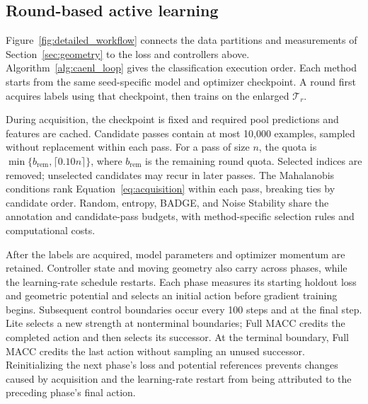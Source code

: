\documentclass[10pt,a4paper,twocolumn]{article}
\begin{document}
\subsection{Round-based active learning}
\label{sec:workflow}

Figure~\ref{fig:detailed_workflow} connects the data partitions and
measurements of Section~\ref{sec:geometry} to the loss and controllers
above. Algorithm~\ref{alg:caenl_loop} gives the classification execution
order. Each method starts from the same seed-specific model and optimizer
checkpoint. A round first acquires labels using that checkpoint, then
trains on the enlarged $\mathcal T_r$.

During acquisition, the checkpoint is fixed and required pool predictions
and features are cached. Candidate passes contain at most 10,000 examples,
sampled without replacement within each pass. For a pass of size $n$,
the quota is $\min\{b_{\mathrm{rem}},\lceil0.10n\rceil\}$, where
$b_{\mathrm{rem}}$ is the remaining round quota. Selected indices are
removed; unselected candidates may recur in later passes. The Mahalanobis
conditions rank Equation~\eqref{eq:acquisition} within each pass,
breaking ties by candidate order. Random, entropy, BADGE, and Noise
Stability share the annotation and candidate-pass budgets, with
method-specific selection rules and computational costs.

After the labels are acquired, model parameters and optimizer momentum
are retained. Controller state and moving geometry also carry across
phases, while the learning-rate schedule restarts. Each phase measures
its starting holdout loss and geometric potential and selects an initial
action before gradient training begins. Subsequent control boundaries
occur every 100 steps and at the final step. Lite selects a new strength
at nonterminal boundaries; Full MACC credits the completed action and
then selects its successor. At the terminal boundary, Full MACC credits
the last action without sampling an unused successor. Reinitializing
the next phase's loss and potential references prevents changes caused
by acquisition and the learning-rate restart from being attributed to
the preceding phase's final action.
\end{document}
